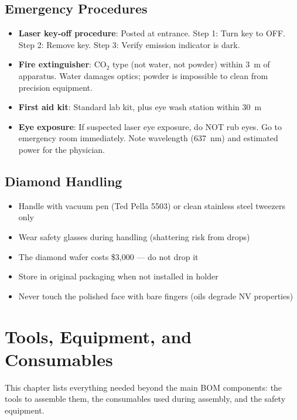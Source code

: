 \documentclass[11pt,a4paper,openany]{book}
\begin{document}
\section{Emergency Procedures}

\begin{itemize}[nosep]
  \item \textbf{Laser key-off procedure}: Posted at entrance. Step 1: Turn key to OFF. Step 2: Remove key. Step 3: Verify emission indicator is dark.
  \item \textbf{Fire extinguisher}: CO$_2$ type (not water, not powder) within 3~m of apparatus. Water damages optics; powder is impossible to clean from precision equipment.
  \item \textbf{First aid kit}: Standard lab kit, plus eye wash station within 30~m
  \item \textbf{Eye exposure}: If suspected laser eye exposure, do NOT rub eyes. Go to emergency room immediately. Note wavelength (637~nm) and estimated power for the physician.
\end{itemize}

\section{Diamond Handling}

\begin{itemize}[nosep]
  \item Handle with vacuum pen (Ted Pella 5503) or clean stainless steel tweezers only
  \item Wear safety glasses during handling (shattering risk from drops)
  \item The diamond wafer costs \$3,000 --- do not drop it
  \item Store in original packaging when not installed in holder
  \item Never touch the polished face with bare fingers (oils degrade NV properties)
\end{itemize}


\chapter{Tools, Equipment, and Consumables}\label{ch:tools}

This chapter lists everything needed beyond the main BOM components: the tools to assemble them, the consumables used during assembly, and the safety equipment.
\end{document}
